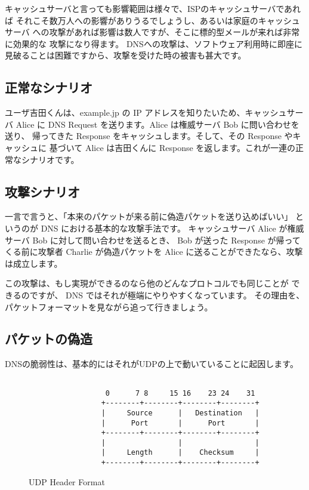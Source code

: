 キャッシュサーバと言っても影響範囲は様々で、ISPのキャッシュサーバであれば
それこそ数万人への影響がありうるでしょうし、あるいは家庭のキャッシュサーバ
への攻撃があれば影響は数人ですが、そこに標的型メールが来れば非常に効果的な
攻撃になり得ます。
DNSへの攻撃は、ソフトウェア利用時に即座に見破ることは困難ですから、攻撃を受けた時の被害も甚大です。

\subsection{正常なシナリオ}
ユーザ吉田くんは、example.jp の IP アドレスを知りたいため、キャッシュサーバ
Alice に DNS Request を送ります。Alice は権威サーバ Bob に問い合わせを送り、
帰ってきた Response をキャッシュします。そして、その Response やキャッシュに
基づいて Alice は吉田くんに Response を返します。これが一連の正常なシナリオです。

\subsection{攻撃シナリオ}
一言で言うと、「本来のパケットが来る前に偽造パケットを送り込めばいい」
というのが DNS における基本的な攻撃手法です。
キャッシュサーバ Alice が権威サーバ Bob に対して問い合わせを送るとき、
Bob が送った Response が帰ってくる前に攻撃者 Charlie が偽造パケットを
Alice に送ることができたなら、攻撃は成立します。

この攻撃は、もし実現ができるのなら他のどんなプロトコルでも同じことが
できるのですが、 DNS ではそれが極端にやりやすくなっています。
その理由を、パケットフォーマットを見ながら追って行きましょう。

\subsection{パケットの偽造}
DNSの脆弱性は、基本的にはそれがUDPの上で動いていることに起因します。

\begin{figure}[hbt]
{\scriptsize
\begin{verbatim}
                                    
                  0      7 8     15 16    23 24    31  
                 +--------+--------+--------+--------+ 
                 |     Source      |   Destination   | 
                 |      Port       |      Port       | 
                 +--------+--------+--------+--------+ 
                 |                 |                 | 
                 |     Length      |    Checksum     | 
                 +--------+--------+--------+--------+ 
\end{verbatim}
}
\caption{UDP Header Format}
\label{UDPHeader}
\end{figure}

